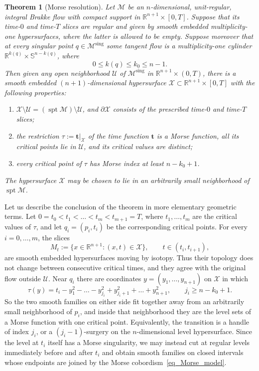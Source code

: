 \documentclass[10pt,a4paper]{amsart}
\newcommand{\IR}{\mathbb{R}}
\newcommand{\IS}{\mathbb{S}}
\newcommand{\UU}{\mathcal{U}}
\newcommand{\MM}{\mathcal{M}}
\newcommand{\XX}{\mathcal{X}}
\DeclareMathOperator{\sing}{sing}
\DeclareMathOperator{\spt}{spt}
\newtheorem{Theorem}[equation]{Theorem}
\numberwithin{equation}{section}
\begin{document}
\begin{Theorem}[Morse resolution]\label{Thm_main}
Let $\MM$ be an $n$-dimensional, unit-regular, integral Brakke flow with compact support in $\IR^{n+1}\times[0,T]$.
Suppose that its time-$0$ and time-$T$ slices are regular and given by smooth embedded multiplicity-one hypersurfaces, where the latter is allowed to be empty.
Suppose moreover that at every singular point $q\in\MM^{\sing}$ some tangent flow is a multiplicity-one cylinder $\IR^{k(q)}\times\IS^{n-k(q)}$, where
\[
 0\leq k(q)\leq k_0\leq n-1.
\]
Then given any open neighborhood $\UU$ of $\MM^{\sing}$ in $\IR^{n+1}\times(0,T)$, there is a smooth embedded $(n+1)$-dimensional hypersurface $\XX\subset\IR^{n+1}\times[0,T]$ with the following properties:
\begin{enumerate}[label=\textup{(\alph*)}]
\item $\XX\setminus\UU=(\spt\MM)\setminus\UU$, and $\partial\XX$ consists of the prescribed time-$0$ and time-$T$ slices;
\item the restriction $\tau:=\mathbf{t}|_{\XX}$ of the time function $\mathbf{t}$ is a Morse function, all its critical points lie in $\UU$, and its critical values are distinct;
\item every critical point of $\tau$ has Morse index at least $n-k_0+1$.
\end{enumerate}
The hypersurface $\XX$ may be chosen to lie in an arbitrarily small neighborhood of $\spt\MM$.
\end{Theorem}


Let us describe the conclusion of the theorem in more elementary geometric terms.
Let $0=t_0<t_1<\ldots<t_m<t_{m+1}=T$, where $t_1,\ldots,t_m$ are the critical values of $\tau$, and let $q_i=(p_i,t_i)$ be the corresponding critical points.
For every $i=0,\ldots,m$, the slices
\[
 M_t:=\{x\in\IR^{n+1}:(x,t)\in\XX\},\qquad t\in(t_i,t_{i+1}),
\]
are smooth embedded hypersurfaces moving by isotopy.
Thus their topology does not change between consecutive critical times, and they agree with the original flow outside $\UU$.
Near $q_i$ there are coordinates $y=(y_1,\ldots,y_{n+1})$ on $\XX$ in which
\[
 \tau(y)=t_i-y_1^2-\ldots-y_{j_i}^2
                 +y_{j_i+1}^2+\ldots+y_{n+1}^2,
 \qquad j_i\geq n-k_0+1.
\tag{2.1}\label{eq_Morse_model}
\]
So the two smooth families on either side fit together away from an arbitrarily small neighborhood of $p_i$, and inside that neighborhood they are the level sets of a Morse function with one critical point.
Equivalently, the transition is a handle of index $j_i$, or a $(j_i-1)$-surgery on the $n$-dimensional level hypersurface.
Since the level at $t_i$ itself has a Morse singularity, we may instead cut at regular levels immediately before and after $t_i$ and obtain smooth families on closed intervals whose endpoints are joined by the Morse cobordism~\eqref{eq_Morse_model}.
\end{document}
